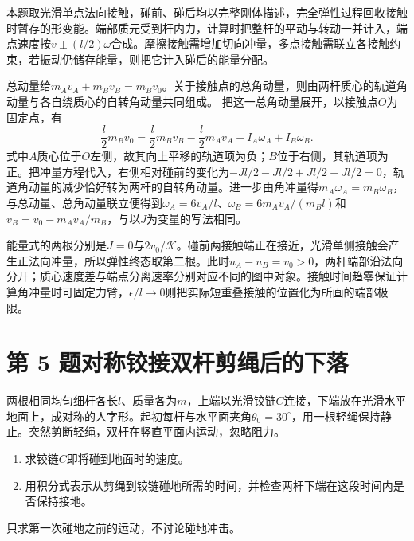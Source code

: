 \documentclass[UTF8,fontset=fandol,a4paper,11pt]{ctexart}
\newcommand{\figcaption}[1]{\par\vspace{2pt}{\small\color{muted}#1}\par}
\begin{document}
本题取光滑单点法向接触，碰前、碰后均以完整刚体描述，完全弹性过程回收接触时暂存的形变能。端部质元受到杆内力，计算时把整杆的平动与转动一并计入，端点速度按$v\pm(l/2)\omega$合成。摩擦接触需增加切向冲量，多点接触需联立各接触约束，若振动仍储存能量，则把它计入碰后的能量分配。

总动量给$m_Av_A+m_Bv_B=m_Bv_0$。关于接触点的总角动量，则由两杆质心的轨道角动量与各自绕质心的自转角动量共同组成。
把这一总角动量展开，以接触点$O$为固定点，有
\[
\frac l2m_Bv_0=\frac l2m_Bv_B-\frac l2m_Av_A+I_A\omega_A+I_B\omega_B.
\]
式中$A$质心位于$O$左侧，故其向上平移的轨道项为负；$B$位于右侧，其轨道项为正。把冲量方程代入，右侧相对碰前的变化为$-Jl/2-Jl/2+Jl/2+Jl/2=0$，轨道角动量的减少恰好转为两杆的自转角动量。进一步由角冲量得$m_A\omega_A=m_B\omega_B$，与总动量、总角动量联立便得到$\omega_A=6v_A/l$、$\omega_B=6m_Av_A/(m_Bl)$和$v_B=v_0-m_Av_A/m_B$，与以$J$为变量的写法相同。

能量式的两根分别是$J=0$与$2v_0/\mathcal K$。碰前两接触端正在接近，光滑单侧接触会产生正法向冲量，所以弹性终态取第二根。此时$u_A-u_B=v_0>0$，两杆端部沿法向分开；质心速度差与端点分离速率分别对应不同的图中对象。接触时间趋零保证计算角冲量时可固定力臂，$\epsilon/l\to0$则把实际短重叠接触的位置化为所画的端部极限。





\section*{第 5 题\quad 对称铰接双杆剪绳后的下落}\label{q:5}


两根相同均匀细杆各长$l$、质量各为$m$，上端以光滑铰链$C$连接，下端放在光滑水平地面上，成对称的人字形。起初每杆与水平面夹角$\theta_0=30^\circ$，用一根轻绳保持静止。突然剪断轻绳，双杆在竖直平面内运动，忽略阻力。
\begin{enumerate}
\item 求铰链$C$即将碰到地面时的速度。
\item 用积分式表示从剪绳到铰链碰地所需的时间，并检查两杆下端在这段时间内是否保持接地。
\end{enumerate}
只求第一次碰地之前的运动，不讨论碰地冲击。


\begin{center}\begin{minipage}{.98\linewidth}\centering
{}
\figcaption{图力试2.5\quad 两杆对称，绳剪断后脚点向两侧张开，铰链竖直下降。}
\end{minipage}\end{center}
\end{document}
